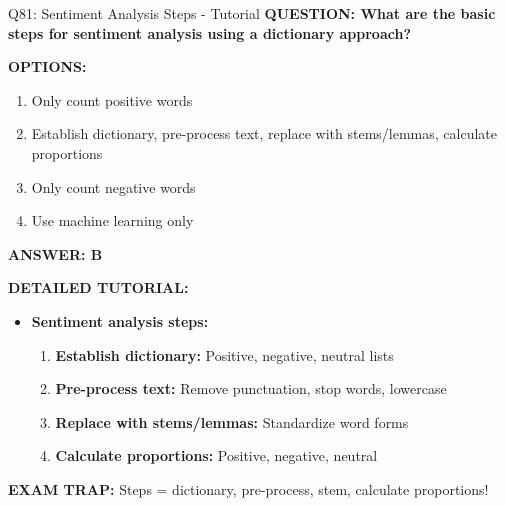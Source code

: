 \documentclass[8pt]{beamer}
\begin{document}
	\begin{frame}{Q81: Sentiment Analysis Steps - Tutorial}
		\fontsize{6.5}{7.5}\selectfont
		\textbf{QUESTION: What are the basic steps for sentiment analysis using a dictionary approach?}
		
		\vspace{0.1cm}
		\textbf{OPTIONS:}
		\begin{enumerate}
			\item Only count positive words
			\item Establish dictionary, pre-process text, replace with stems/lemmas, calculate proportions
			\item Only count negative words
			\item Use machine learning only
		\end{enumerate}
		
		\vspace{0.1cm}
		\textcolor{myblue}{\textbf{ANSWER: B}}
		
		\vspace{0.1cm}
		\textbf{DETAILED TUTORIAL:}
		\begin{itemize}
			\item \textbf{Sentiment analysis steps:}
			\begin{enumerate}
				\item \textbf{Establish dictionary:} Positive, negative, neutral lists
				\item \textbf{Pre-process text:} Remove punctuation, stop words, lowercase
				\item \textbf{Replace with stems/lemmas:} Standardize word forms
				\item \textbf{Calculate proportions:} Positive, negative, neutral
			\end{enumerate}
		\end{itemize}
		
		\textcolor{myred}{\textbf{EXAM TRAP:}} Steps = \textcolor{myblue}{dictionary, pre-process, stem, calculate proportions}!
	\end{frame}
	
\end{document}
